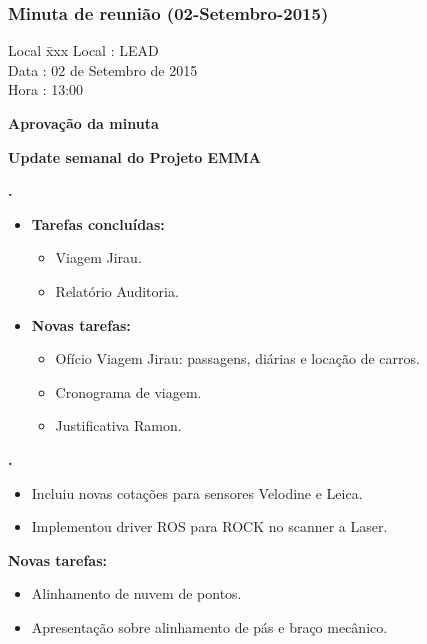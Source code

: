 \subsubsection{Minuta de reunião (02-Setembro-2015)}

\begin{tabbing}
  Local \= xxx \kill
  Local \> : LEAD \\
  Data  \> : 02 de Setembro de 2015 \\
  Hora  \> : 13:00
\end{tabbing}


\textbf{Aprovação da minuta}

\textbf{Update semanal do Projeto EMMA}
   							
\textbf{\alana.} 
	\begin{itemize}
		\item \textbf{Tarefas concluídas:}
			\begin{itemize}    
				\item Viagem Jirau.
				\item Relatório Auditoria.
			\end{itemize}
		
		\item \textbf{Novas tarefas:}
			\begin{itemize} 
				\item Ofício Viagem Jirau: passagens, diárias e locação de carros.
				\item Cronograma de viagem.
				\item Justificativa Ramon.
			\end{itemize}
	\end{itemize}   		
						
\textbf{\gabriel.} 
	\begin{itemize}
			\item Incluiu novas cotações para sensores Velodine e Leica.
			\item Implementou driver ROS para ROCK no scanner a Laser.
			\end{itemize}
		
		\item \textbf{Novas tarefas:}
			\begin{itemize} 
				\item Alinhamento de nuvem de pontos.
				\item Apresentação sobre alinhamento de pás e braço mecânico.
			\end{itemize}


